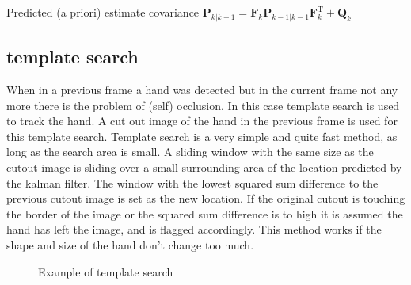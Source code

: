 Predicted (a priori) estimate covariance
$\textbf{P}_{k|k-1} = \textbf{F}_{k} \textbf{P}_{k-1|k-1} \textbf{F}_{k}^{\text{T}} + \textbf{Q}_{k}$


\subsection*{template search}
When in a previous frame a hand was detected but in the current frame not any more there is the problem of (self) occlusion. In this case template search is used to track the hand. A cut out image of the hand in the previous frame is used for this template search. Template search is a very simple and quite fast method, as long as the search area is small. A sliding window  with the same size as the cutout image is sliding over a small surrounding area of the location predicted by the kalman filter. The window with the lowest squared sum difference to the previous cutout image is set as the new location. If the original cutout is touching the border of the image or the squared sum difference is to high it is assumed the hand has left the image, and is flagged accordingly. This method works if the shape and size of the hand don't change too much.

\begin{figure}[htbp]
\begin{center}
\hspace{0.03\linewidth}

\end{center}
\caption{Example of template search}
\label{fig:templatesearch}
\end{figure}


